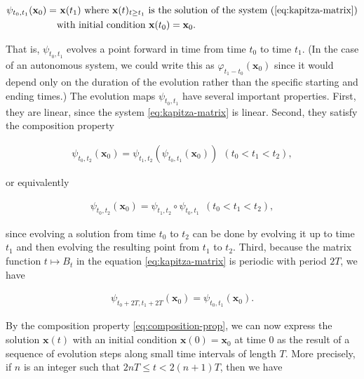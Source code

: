\documentclass[11pt]{report}
\theoremstyle{plain}
\theoremstyle{definition}
\begin{document}
\begin{align*}
\psi_{t_0,t_1}(\mathbf{x}_0) = &\ \mathbf{x}(t_1)\textrm{ where $\mathbf{x}(t)_{t\ge t_1}$ is the solution of the system (\ref{eq:kapitza-matrix})}\\ & \textrm{with initial condition $\mathbf{x}(t_0)=\mathbf{x}_0$}.
\end{align*}

\noindent That is, $\psi_{t_0,t_1}$ evolves a point forward in
time from time $t_0$ to time $t_1$. (In the case of an
autonomous system, we could write this as
$\varphi_{t_1-t_0}(\mathbf{x}_0)$ since it would
depend only on the duration of the evolution rather
than the specific starting and ending times.) The
evolution maps $\psi_{t_0,t_1}$ have several important
properties. First, they are linear, since the system
\eqref{eq:kapitza-matrix} is linear. Second, they satisfy
the composition property

\begin{align*}
\psi_{t_0,t_2}(\mathbf{x}_0) = \psi_{t_1,t_2}( \psi_{t_0,t_1}(\mathbf{x}_0)) \ \ (t_0<t_1<t_2),
\end{align*}

\noindent or equivalently

\begin{equation*} \tag{40}\label{eq:composition-prop}
\begin{split}
\psi_{t_0,t_2}(\mathbf{x}_0) = \psi_{t_1,t_2}\circ \psi_{t_0,t_1}\ \ (t_0<t_1<t_2),
\end{split}
\end{equation*}

\noindent since evolving a solution from time $t_0$ to $t_2$ can
be done by evolving it up to time $t_1$ and then
evolving the resulting point from $t_1$ to $t_2$.
Third, because the matrix function $t\mapsto B_t$ in
the equation \eqref{eq:kapitza-matrix} is periodic with
period $2T$, we have

\begin{align*}
\psi_{t_0+2T,t_1+2T}(\mathbf{x}_0) = \psi_{t_0,t_1}(\mathbf{x}_0).
\end{align*}

\noindent By the composition property \eqref{eq:composition-prop},
we can now express the solution $\mathbf{x}(t)$ with
an initial condition $\mathbf{x}(0)=\mathbf{x}_0$ at
time $0$ as the result of a sequence of evolution
steps along small time intervals of length $T$. More
precisely, if $n$ is an integer such that
$2nT \le t < 2(n+1)T$, then we have
\end{document}
